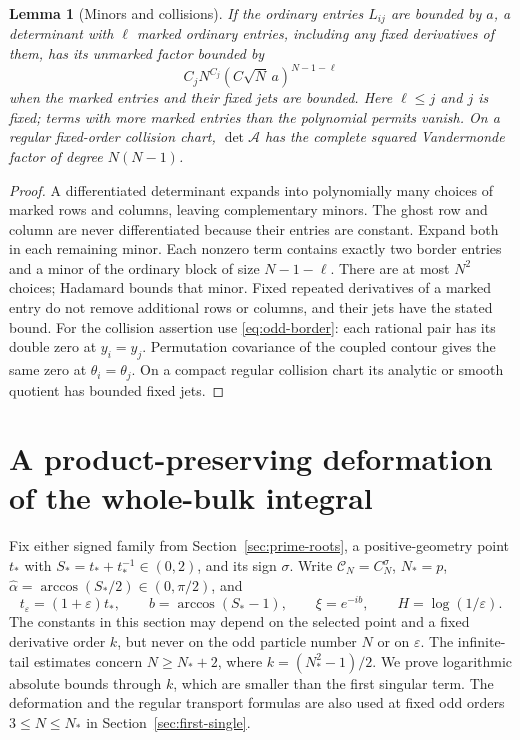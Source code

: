 \documentclass[11pt]{article}
\numberwithin{equation}{section}
\newtheorem{lemma}[theorem]{Lemma}
\theoremstyle{remark}\newtheorem{remark}[theorem]{Remark}
\begin{document}
\begin{lemma}[Minors and collisions]\label{lem:border-minors}
If the ordinary entries $L_{ij}$ are bounded by $a$, a determinant
with $\ell$ marked ordinary entries, including any fixed derivatives
of them, has its unmarked factor bounded by
\[
 C_j N^{C_j}(C\sqrt N\,a)^{N-1-\ell}
\]
when the marked entries and their fixed jets are bounded.
Here $\ell\le j$ and $j$ is fixed; terms with more marked entries
than the polynomial permits vanish.
On a regular fixed-order collision chart, $\det\mathcal A$
has the complete squared Vandermonde factor of degree $N(N-1)$.
\end{lemma}
\begin{proof}
A differentiated determinant expands into polynomially many
choices of marked rows and columns, leaving complementary minors.
The ghost row and column are never differentiated because their
entries are constant. Expand both in each remaining minor.
Each nonzero term contains exactly two border entries and a minor
of the ordinary block of size $N-1-\ell$.
There are at most $N^2$ choices; Hadamard bounds that minor.
Fixed repeated derivatives of a marked entry do not remove
additional rows or columns, and their jets have the stated bound.
For the collision assertion use \eqref{eq:odd-border}:
each rational pair has its double zero at $y_i=y_j$.
Permutation covariance of the coupled contour gives the same
zero at $\theta_i=\theta_j$. On a compact regular collision
chart its analytic or smooth quotient has bounded fixed jets.
\end{proof}
\section{A product-preserving deformation of the whole-bulk integral}
\label{sec:constrained-deformation}

Fix either signed family from Section~\ref{sec:prime-roots},
a positive-geometry point $t_*$ with $S_*=t_*+t_*^{-1}\in(0,2)$,
and its sign $\sigma$. Write $\mathcal C_N=C_N^\sigma$,
$N_*=p$, $\widehat\alpha=\arccos(S_*/2)\in(0,\pi/2)$, and
\[
 t_\varepsilon=(1+\varepsilon)t_*,\qquad
 b=\arccos(S_*-1),\qquad \xi=e^{-ib},\qquad
 H=\log(1/\varepsilon).
\]
The constants in this section may depend on the selected point and a
fixed derivative order $k$, but never on the odd particle number $N$
or on $\varepsilon$.  The infinite-tail estimates concern $N\ge N_*+2$, where
$k=(N_*^2-1)/2$.
We prove logarithmic absolute bounds through $k$, which are
smaller than the first singular term. The deformation and the regular transport formulas
are also used at fixed odd orders $3\le N\le N_*$ in
Section~\ref{sec:first-single}.
\end{document}
